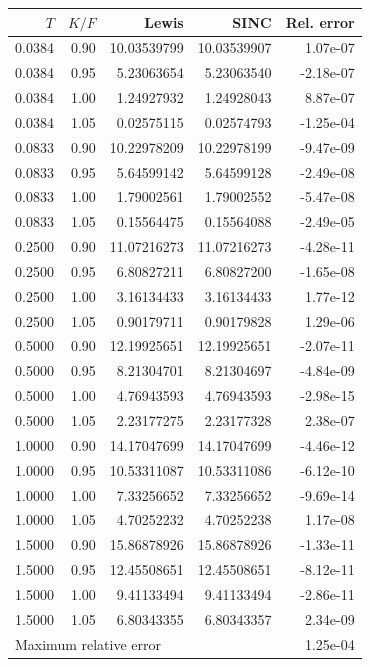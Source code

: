 \begin{tabular}{rrrrr}
\toprule
$T$ & $K/F$ & Lewis & SINC & Rel. error\\
\midrule
0.0384 & 0.90 & 10.03539799 & 10.03539907 & 1.07e-07\\
0.0384 & 0.95 & 5.23063654 & 5.23063540 & -2.18e-07\\
0.0384 & 1.00 & 1.24927932 & 1.24928043 & 8.87e-07\\
0.0384 & 1.05 & 0.02575115 & 0.02574793 & -1.25e-04\\
0.0833 & 0.90 & 10.22978209 & 10.22978199 & -9.47e-09\\
0.0833 & 0.95 & 5.64599142 & 5.64599128 & -2.49e-08\\
0.0833 & 1.00 & 1.79002561 & 1.79002552 & -5.47e-08\\
0.0833 & 1.05 & 0.15564475 & 0.15564088 & -2.49e-05\\
0.2500 & 0.90 & 11.07216273 & 11.07216273 & -4.28e-11\\
0.2500 & 0.95 & 6.80827211 & 6.80827200 & -1.65e-08\\
0.2500 & 1.00 & 3.16134433 & 3.16134433 & 1.77e-12\\
0.2500 & 1.05 & 0.90179711 & 0.90179828 & 1.29e-06\\
0.5000 & 0.90 & 12.19925651 & 12.19925651 & -2.07e-11\\
0.5000 & 0.95 & 8.21304701 & 8.21304697 & -4.84e-09\\
0.5000 & 1.00 & 4.76943593 & 4.76943593 & -2.98e-15\\
0.5000 & 1.05 & 2.23177275 & 2.23177328 & 2.38e-07\\
1.0000 & 0.90 & 14.17047699 & 14.17047699 & -4.46e-12\\
1.0000 & 0.95 & 10.53311087 & 10.53311086 & -6.12e-10\\
1.0000 & 1.00 & 7.33256652 & 7.33256652 & -9.69e-14\\
1.0000 & 1.05 & 4.70252232 & 4.70252238 & 1.17e-08\\
1.5000 & 0.90 & 15.86878926 & 15.86878926 & -1.33e-11\\
1.5000 & 0.95 & 12.45508651 & 12.45508651 & -8.12e-11\\
1.5000 & 1.00 & 9.41133494 & 9.41133494 & -2.86e-11\\
1.5000 & 1.05 & 6.80343355 & 6.80343357 & 2.34e-09\\
\midrule
\multicolumn{4}{l}{Maximum relative error} & 1.25e-04\\
\bottomrule
\end{tabular}
